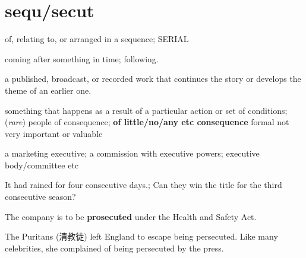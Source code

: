 \chapter{sequ/secut}

\begin{vocabulary}
    of, relating to, or arranged in a sequence; SERIAL
\end{vocabulary}

\begin{vocabulary}
    coming after something in time; following.
\end{vocabulary}

\begin{vocabulary}[sequel]
    a published, broadcast, or recorded work that continues the story or develops the theme of an earlier one.
\end{vocabulary}

\begin{vocabulary}
    something that happens as a result of a particular action or set of conditions; (\textit{rare}) people of consequence; \textbf{of little/no/any etc consequence} formal not very important or valuable
\end{vocabulary}

\begin{vocabulary}
    a marketing executive; a commission with executive powers;
    executive body/committee etc
\end{vocabulary}

\begin{vocabulary}[consecutive]
    It had rained for four consecutive days.;
    Can they win the title for the third consecutive season?
\end{vocabulary}

\begin{vocabulary}
    The company is to be \textbf{prosecuted} under the Health and Safety Act.
\end{vocabulary}

\begin{vocabulary}[presecute]
    The Puritans (清教徒) left England to escape being persecuted. Like many celebrities, she complained of being persecuted by the press.
\end{vocabulary}